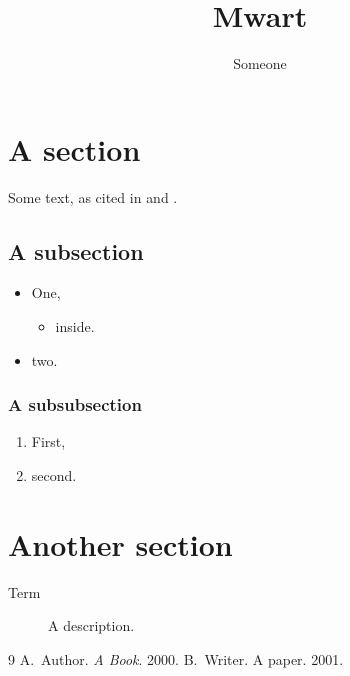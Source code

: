 \documentclass{mwart}
\title{Mwart}
\author{Someone}
\begin{document}
\maketitle
\tableofcontents
\section{A section}
Some text, as cited in \cite{book} and \cite{paper}.
\subsection{A subsection}
\begin{itemize}
    \item One,
    \begin{itemize}
        \item inside.
    \end{itemize}
    \item two.
\end{itemize}
\subsubsection{A subsubsection}
\begin{enumerate}
    \item First,
    \item second.
\end{enumerate}
\section{Another section}
\begin{description}
    \item[Term] A description.
\end{description}
\begin{thebibliography}{9}
 A.~Author. \emph{A Book}. 2000.
 B.~Writer. A paper. 2001.
\end{thebibliography}
\end{document}

